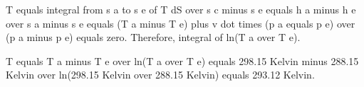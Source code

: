 T equals integral from s a to s e of T dS over s c minus s e equals h a minus h e over s a minus s e equals (T a minus T e) plus v dot times (p a equals p e) over (p a minus p e) equals zero. Therefore, integral of ln(T a over T e).

T equals T a minus T e over ln(T a over T e) equals 298.15 Kelvin minus 288.15 Kelvin over ln(298.15 Kelvin over 288.15 Kelvin) equals 293.12 Kelvin.